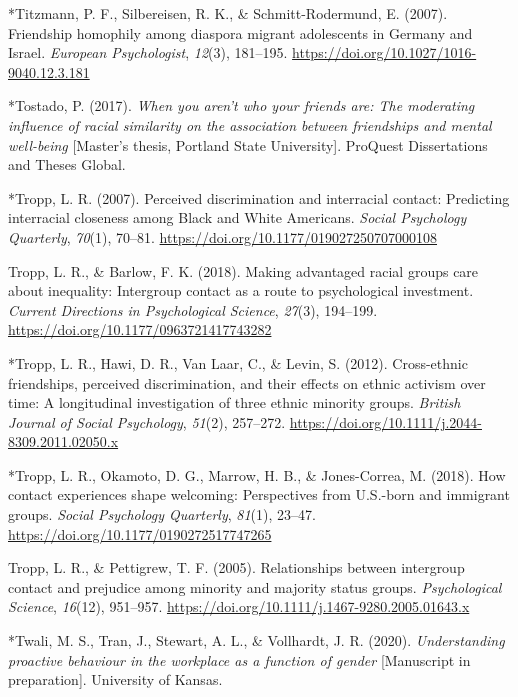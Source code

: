 \documentclass[12pt, letterpaper]{article}
\begin{document}
\leavevmode\hypertarget{ref-1966}{}%
*Titzmann, P. F., Silbereisen, R. K., \& Schmitt-Rodermund, E. (2007).
Friendship homophily among diaspora migrant adolescents in Germany and
Israel. \emph{European Psychologist}, \emph{12}(3), 181--195.
\url{https://doi.org/10.1027/1016-9040.12.3.181}

\leavevmode\hypertarget{ref-1221}{}%
*Tostado, P. (2017). \emph{When you aren't who your friends are: The
moderating influence of racial similarity on the association between
friendships and mental well-being} {[}Master's thesis, Portland State
University{]}. ProQuest Dissertations and Theses Global.

\leavevmode\hypertarget{ref-933}{}%
*Tropp, L. R. (2007). Perceived discrimination and interracial contact:
Predicting interracial closeness among Black and White Americans.
\emph{Social Psychology Quarterly}, \emph{70}(1), 70--81.
\url{https://doi.org/10.1177/019027250707000108}

\leavevmode\hypertarget{ref-tropp_making_2018}{}%
Tropp, L. R., \& Barlow, F. K. (2018). Making advantaged racial groups
care about inequality: Intergroup contact as a route to psychological
investment. \emph{Current Directions in Psychological Science},
\emph{27}(3), 194--199. \url{https://doi.org/10.1177/0963721417743282}

\leavevmode\hypertarget{ref-1743}{}%
*Tropp, L. R., Hawi, D. R., Van Laar, C., \& Levin, S. (2012).
Cross-ethnic friendships, perceived discrimination, and their effects on
ethnic activism over time: A longitudinal investigation of three ethnic
minority groups. \emph{British Journal of Social Psychology},
\emph{51}(2), 257--272.
\url{https://doi.org/10.1111/j.2044-8309.2011.02050.x}

\leavevmode\hypertarget{ref-1658}{}%
*Tropp, L. R., Okamoto, D. G., Marrow, H. B., \& Jones-Correa, M.
(2018). How contact experiences shape welcoming: Perspectives from
U.S.-born and immigrant groups. \emph{Social Psychology Quarterly},
\emph{81}(1), 23--47. \url{https://doi.org/10.1177/0190272517747265}

\leavevmode\hypertarget{ref-tropp_relationships_2005}{}%
Tropp, L. R., \& Pettigrew, T. F. (2005). Relationships between
intergroup contact and prejudice among minority and majority status
groups. \emph{Psychological Science}, \emph{16}(12), 951--957.
\url{https://doi.org/10.1111/j.1467-9280.2005.01643.x}

\leavevmode\hypertarget{ref-2394}{}%
*Twali, M. S., Tran, J., Stewart, A. L., \& Vollhardt, J. R. (2020).
\emph{Understanding proactive behaviour in the workplace as a function
of gender} {[}Manuscript in preparation{]}. University of Kansas.
\end{document}
